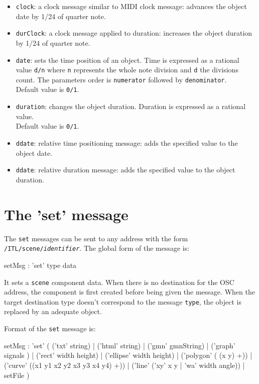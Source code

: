 \documentclass[a4paper,twoside]{report}
\newcommand{\toplevel}[1]	{\chapter{#1}}
\newcommand{\OSC}[1]		{\texttt{#1}}
\newcommand{\values}[1]	{\texttt{#1}}
\begin{document}
\begin{itemize}
\item \OSC{clock}: a clock message similar to MIDI clock message: advances the object date by 1/24 of quarter note.
\item \OSC{durClock}: a clock message applied to duration: increases the object duration by 1/24 of quarter note.
\item \OSC{date}: sets the time position of an object. Time is expressed as a rational value \values{d/n} where \values{n} represents the whole note division and \values{d} the divisions count. The parameters order is \values{numerator} followed by \values{denominator}.\\
Default value is \values{0/1}.
\item \OSC{duration}: changes the object duration. Duration is expressed as a rational value. \\
Default value is \values{0/1}.
\item \OSC{ddate}: relative time positioning message: adds the specified value to the object date.
\item \OSC{ddate}: relative duration message: adds the specified value to the object duration.
\end{itemize}


\toplevel{The 'set' message}
\label{setsect}
The \OSC{set} messages can be sent to any address with the form \OSC{/ITL/scene/\textit{identifier}}. The global form of the message is:

\begin{rail}
setMsg : 'set' type data
\end{rail}

It sets a \OSC{scene} component data. When there is no destination for the OSC address, the component is first created before being given the message. When the target destination type doesn't correspond to the message \OSC{type}, the object is replaced by an adequate object.

Format of the \OSC{set} message is:
\begin{rail}
setMsg : 'set' (
	('txt' string) |
	('html' string) |
	('gmn' gmnString) |
	('graph' signals ) |
	('rect' width height) |
	('ellipse' width height) |
	('polygon' ( (x y) +)) |
	('curve' ((x1 y1 x2 y2 x3 y3 x4 y4) +)) |
	('line' ('xy' x y | 'wa' width angle)) |
	setFile
)
\end{rail}
\end{document}
